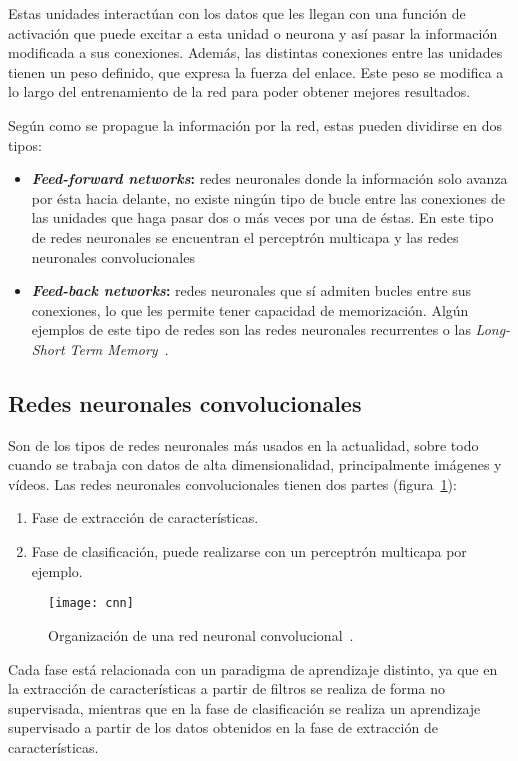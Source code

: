 Estas unidades interactúan con los datos que les llegan con una función de activación que puede excitar a esta unidad o neurona y así pasar la información modificada a sus conexiones. Además, las distintas conexiones entre las unidades tienen un peso definido, que expresa la fuerza del enlace. Este peso se modifica a lo largo del entrenamiento de la red para poder obtener mejores resultados.

Según como se propague la información por la red, estas pueden dividirse en dos tipos:
\begin{itemize}
	\item \textbf{\textit{Feed-forward networks}:} redes neuronales donde la información solo avanza por ésta hacia delante, no existe ningún tipo de bucle entre las conexiones de las unidades que haga pasar dos o más veces por una de éstas. En este tipo de redes neuronales se encuentran el perceptrón multicapa y las redes neuronales convolucionales
	\item \textbf{\textit{Feed-back networks}:} redes neuronales que sí admiten bucles entre sus conexiones, lo que les permite tener capacidad de memorización. Algún ejemplos de este tipo de redes son las redes neuronales recurrentes o las \textit{Long-Short Term Memory}~\cite{lstm}.
\end{itemize}
\subsection{Redes neuronales convolucionales}
Son de los tipos de redes neuronales más usados en la actualidad, sobre todo cuando se trabaja con datos de alta dimensionalidad, principalmente imágenes y vídeos. Las redes neuronales convolucionales tienen dos partes (figura~\ref{fig:cnn}):
\begin{enumerate}
	\item Fase de extracción de características.
	\item Fase de clasificación, puede realizarse con un perceptrón multicapa por ejemplo.
\end{enumerate}

\begin{figure}[h]
	\centering
	\texttt{[image: cnn]}
	\caption{Organización de una red neuronal convolucional~\cite{cnn}.}
	\label{fig:cnn}
\end{figure}

Cada fase está relacionada con un paradigma de aprendizaje distinto, ya que en la extracción de características a partir de filtros se realiza de forma no supervisada, mientras que en la fase de clasificación se realiza un aprendizaje supervisado a partir de los datos obtenidos en la fase de extracción de características.


